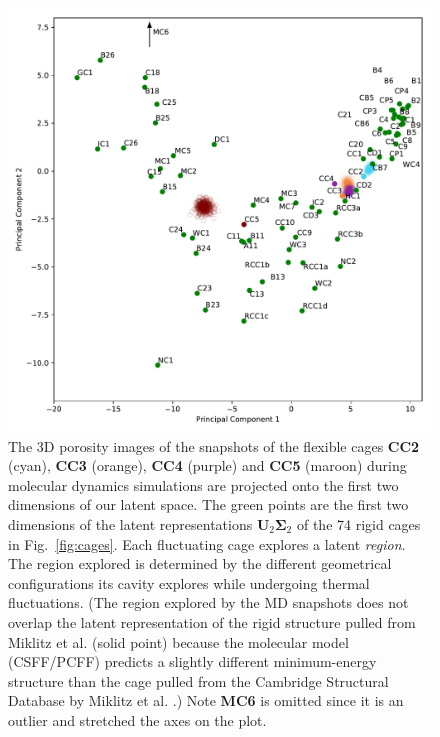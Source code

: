 \documentclass[journal=jacsat,manuscript=article]{achemso}
\begin{document}
{\begin{figure}
\centering
	\includegraphics[width=\columnwidth]{../PCA_latent_cage_space_with_flexible_cages_2D.pdf}
	\caption{\color{red}The 3D porosity images of the snapshots of the flexible cages \textbf{CC2} (cyan), \textbf{CC3} (orange), \textbf{CC4} (purple) and \textbf{CC5} (maroon) during molecular dynamics simulations are projected onto the first two dimensions of our latent space. The green points are the first two dimensions of the latent representations $\mathbf{U}_2\mathbf{\Sigma}_2$ of the 74 rigid cages in Fig.~\ref{fig:cages}. Each fluctuating cage explores a latent \emph{region}. The region explored is determined by the different geometrical configurations its cavity explores while undergoing thermal fluctuations. (The region explored by the MD snapshots does not overlap the latent representation of the rigid structure pulled from Miklitz et al. \cite{miklitz2017computational} (solid point) because the molecular model (CSFF/PCFF) predicts a slightly different minimum-energy structure than the cage pulled from the Cambridge Structural Database by Miklitz et al. \cite{miklitz2017computational}.) Note \textbf{MC6} is omitted since it is an outlier and stretched the axes on the plot. 
	} \label{fig:pca_space_with_flex}
\end{figure}

}
\end{document}
